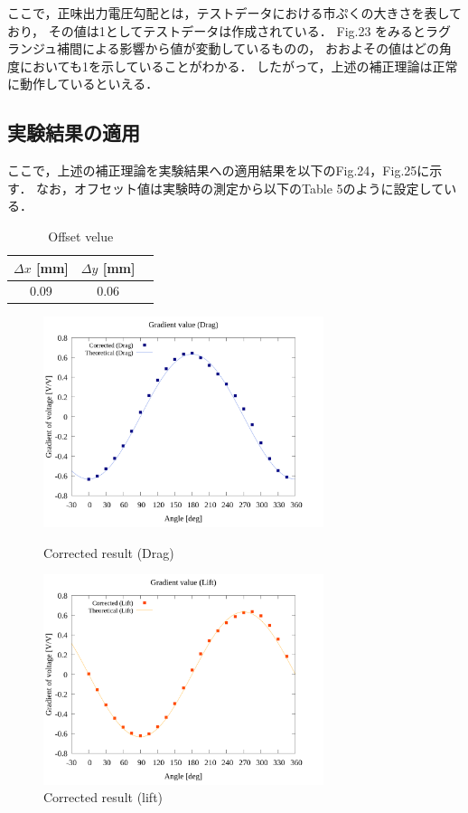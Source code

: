 \documentclass[twocolumn,a4j]{jsarticle}
\begin{document}
\newpage

ここで，正味出力電圧勾配とは，テストデータにおける市ぷくの大きさを表しており，
その値は1としてテストデータは作成されている．
Fig.23 をみるとラグランジュ補間による影響から値が変動しているものの，
おおよその値はどの角度においても1を示していることがわかる．
したがって，上述の補正理論は正常に動作しているといえる．\\

\subsection{実験結果の適用}

ここで，上述の補正理論を実験結果への適用結果を以下のFig.24，Fig.25に示す．
なお，オフセット値は実験時の測定から以下のTable 5のように設定している．

\begin{table}[htbp]
    \begin{center}
        \caption{Offset velue}
        \begin{tabular}{|p{30mm}|p{20mm}|p{20mm}|}
            \hline
            \multicolumn{1}{|c|}{$\Delta x$ [mm]} & \multicolumn{1}{|c|}{$\Delta y$ [mm]} \\ \hline
            \multicolumn{1}{|c|}{0.09}           & \multicolumn{1}{|c|}{0.06}           \\ \hline
        \end{tabular}
    \end{center}
\end{table}

\begin{figure}[htbp]
    \begin{center}
        \includegraphics[width=82mm]{../../../02_workspace/result/2-ex/plot/21/21-4_corrected_angle_drag.png}
        \caption{Corrected result (Drag)}
        \includegraphics[width=82mm]{../../../02_workspace/result/2-ex/plot/21/21-4_corrected_angle_lift.png}
        \caption{Corrected result (lift)}
    \end{center}
\end{figure}
\end{document}
